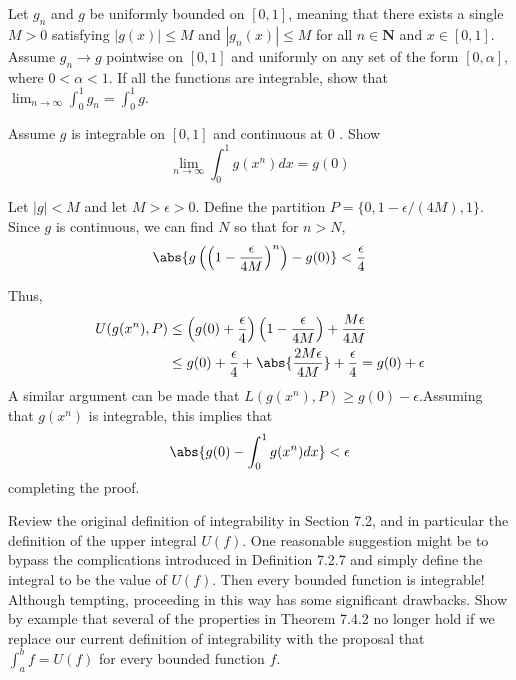 \begin{exercise}
Let $g_{n}$ and $g$ be uniformly bounded on $[0,1]$, meaning that there exists a single $M>0$ satisfying $|g(x)| \leq M$ and $\left|g_{n}(x)\right| \leq M$ for all $n \in \mathbf{N}$ and $x \in[0,1]$. Assume $g_{n} \rightarrow g$ pointwise on $[0,1]$ and uniformly on any set of the form $[0, \alpha]$, where $0<\alpha<1$.
If all the functions are integrable, show that $\lim _{n \rightarrow \infty} \int_{0}^{1} g_{n}=\int_{0}^{1} g$.
\end{exercise}

\begin{solution}
    \TODO
\end{solution}

\begin{exercise} Assume $g$ is integrable on $[0,1]$ and continuous at 0 . Show
$$
\lim _{n \rightarrow \infty} \int_{0}^{1} g\left(x^{n}\right) d x=g(0)
$$
\end{exercise}
\begin{solution}
Let \(|g| < M\) and let \(M > \epsilon > 0\). Define the partition \(P = \{0, 1-\epsilon/(4M), 1\}\). Since \(g\) is continuous, we can find \(N\) so that for \(n > N\),
\[\abs{g\left(\left(1- \frac{\epsilon}{4M}\right)^n\right) - g(0)} < \frac{\epsilon}{4}\]

Thus,
\[\begin{aligned}
    U(g(x^n), P) &\leq \left(g(0) + \frac{\epsilon}{4}\right) \left(1-\frac{\epsilon}{4M}\right) + \frac{M\epsilon}{4M} \\
    &\leq g(0) + \frac{\epsilon}{4} + \abs{\frac{2M \epsilon}{4M}} + \frac{\epsilon}{4} = g(0) + \epsilon
\end{aligned}
    \]
    A similar argument can be made that \(L(g(x^n), P) \geq g(0) - \epsilon\).Assuming that \(g(x^n)\) is integrable, this implies that
    \[\abs{g(0) - \int^1_0 g(x^n) dx} < \epsilon\]
completing the proof.
\end{solution}

\begin{exercise}
Review the original definition of integrability in Section 7.2, and in particular the definition of the upper integral $U(f)$. One reasonable suggestion might be to bypass the complications introduced in Definition 7.2.7 and simply define the integral to be the value of $U(f)$. Then every bounded function is integrable! Although tempting, proceeding in this way has some significant drawbacks. Show by example that several of the properties in Theorem 7.4.2 no longer hold if we replace our current definition of integrability with the proposal that $\int_{a}^{b} f=U(f)$ for every bounded function $f$.
\end{exercise}
\begin{solution}
    \TODO
\end{solution}
